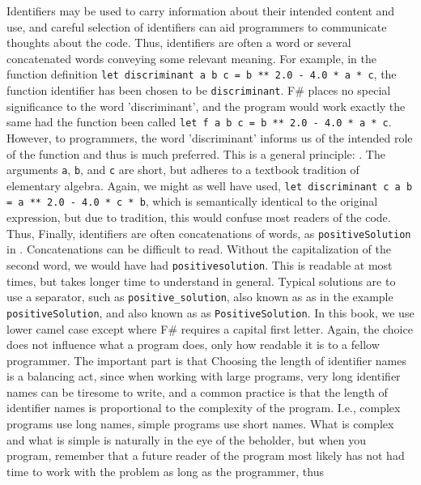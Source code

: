 \documentclass[fsharpNotes.tex]{subfiles}
\begin{document}
Identifiers may be used to carry information about their intended content and use, and careful selection of identifiers can aid programmers to communicate thoughts about the code. Thus, identifiers are often a word or several concatenated words conveying some relevant meaning. For example, in the function definition \lstinline{let discriminant a b c = b ** 2.0 - 4.0 * a * c}, the function identifier has been chosen to be \lstinline{discriminant}. F\# places no special significance to the word 'discriminant', and the program would work exactly the same had the function been called \lstinline{let f a b c = b ** 2.0 - 4.0 * a * c}. However, to programmers, the word 'discriminant' informs us of the intended role of the function and thus is much preferred. This is a general principle: . The arguments \lstinline{a}, \lstinline{b}, and \lstinline{c} are short, but adheres to a textbook tradition of elementary algebra. Again, we might as well have used, \lstinline{let discriminant c a b = a ** 2.0 - 4.0 * c * b}, which is semantically identical to the original expression, but due to tradition, this would confuse most readers of the code. Thus,  Finally, identifiers are often concatenations of words, as \lstinline{positiveSolution} in . Concatenations can be difficult to read. Without the capitalization of the second word, we would have had \lstinline{positivesolution}. This is readable at most times, but takes longer time to understand in general. Typical solutions are to use a separator, such as \lstinline{positive_solution},  also known as  as in the example \lstinline{positiveSolution}, and  also known as  as \lstinline{PositiveSolution}. In this book, we use lower camel case except where F\# requires a capital first letter. Again, the choice does not influence what a program does, only how readable it is to a fellow programmer. The important part is that  Choosing the length of identifier names is a balancing act, since when working with large programs, very long identifier names can be tiresome to write, and a common practice is that the length of identifier names is proportional to the complexity of the program. I.e., complex programs use long names, simple programs use short names. What is complex and what is simple is naturally in the eye of the beholder, but when you program, remember that a future reader of the program most likely has not had time to work with the problem as long as the programmer, thus 
\end{document}
